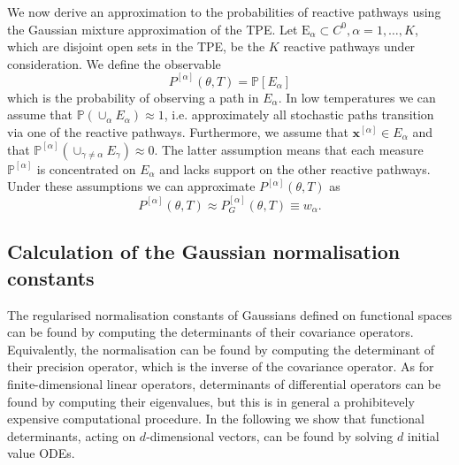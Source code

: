 We now derive an approximation to the probabilities of reactive pathways
using the Gaussian mixture approximation of the TPE. Let $\mathrm{E}_{\alpha}\subset C^{0},\alpha=1,\dots,K$,
which are disjoint open sets in the TPE, be the $K$ reactive pathways
under consideration. We define the observable
\begin{equation}
P^{[\alpha]}(\theta,T)=\mathbb{P}[E_{\alpha}]
\end{equation}
which is the probability of observing a path in $E_{\alpha}$. In
low temperatures we can assume that $\mathbb{P}(\cup_{\alpha}E_{\alpha})\approx1$,
i.e. approximately all stochastic paths transition via one of the
reactive pathways. Furthermore, we assume that $\mathbf{x}^{[\alpha]}\in E_{\alpha}$
and that $\mathbb{P}^{[\alpha]}(\cup_{\gamma\neq\alpha}E_{\gamma})\approx0$.
The latter assumption means that each measure $\mathbb{P}^{[\alpha]}$
is concentrated on $E_{\alpha}$ and lacks support on the other reactive
pathways. Under these assumptions we can approximate $P^{[\alpha]}(\theta,T)$
as
\begin{equation}
P^{[\alpha]}(\theta,T)\approx P_{G}^{[\alpha]}(\theta,T)\equiv w_{\alpha}.
\end{equation}


\subsection{Calculation of the Gaussian normalisation constants}

The regularised normalisation constants of Gaussians defined on functional
spaces can be found by computing the determinants of their covariance
operators. Equivalently, the normalisation can be found by computing
the determinant of their precision operator, which is the inverse
of the covariance operator. As for finite-dimensional linear operators,
determinants of differential operators can be found by computing their
eigenvalues, but this is in general a prohibitevely expensive computational
procedure. In the following we show that functional determinants,
acting on $d$-dimensional vectors, can be found by solving $d$ initial
value ODEs.


